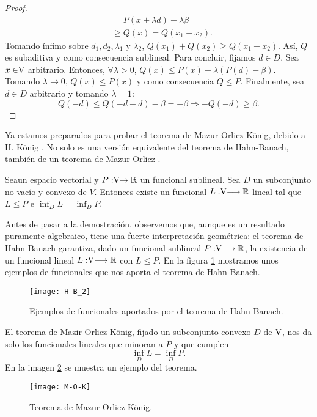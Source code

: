 \begin{proof}
\begin{equation*}
\begin{split}
		& = P(x +\lambda d) - \lambda \beta\\ 
		& \geq Q(x) = Q(x_1 + x_2).
		\end{split}
		\end{equation*}
		Tomando ínfimo sobre $ d_1, d_2, \lambda_1 $ y $ \lambda_2 $, $  Q(x_1) + Q (x_2 ) \geq Q (x_1 + x_2 ) $. Así, $ Q $ es subaditiva y como consecuencia sublineal. Para concluir, fijamos $ d \in D $. Sea $ x \in \vecSpace $ arbitrario. Entonces, $ \forall \lambda > 0 $, $ Q(x) \leq P(x) + \lambda (P(d) - \beta )$. Tomando $ \lambda \longrightarrow 0 $, $ Q(x) \leq P(x)$ y como consecuencia $ Q \leq P $. Finalmente, sea $ d \in D $ arbitrario y tomando $ \lambda = 1 $:
		\[Q(-d) \leq Q(-d+d) - \beta = -\beta \Longrightarrow  -Q(-d) \geq \beta.  \]
		
	\end{proof}
\bigskip

Ya estamos preparados para probar el teorema de Mazur-Orlicz-König, debido a H. König \cite{König1, König2}. No solo es una versión equivalente del teorema de Hahn-Banach, también de un teorema de Mazur-Orlicz \cite{mo}. 

\bigskip
	
	\begin{teoremaBox}\label{M-O}
		Sea\vecSpace un espacio vectorial y $P:\vecSpace \rightarrow \RR$ un funcional sublineal.  Sea $ D $ un subconjunto no vacío y convexo de $ V $. Entonces existe un funcional $ L: \vecSpace \longrightarrow \RR $ lineal tal que $ L \leq P $ e $ \inf_D L = \inf_D P $.
	\end{teoremaBox}

Antes de pasar a la demostración, observemos que, aunque es un resultado puramente algebraico, tiene una fuerte interpretación geométrica: el teorema de Hahn-Banach garantiza, dado un funcional sublineal $ P: \vecSpace \longrightarrow \RR $, la existencia de un funcional lineal $ L:\vecSpace \longrightarrow \RR $ con $ L \leq P $. En la figura \ref{H-B-varios} mostramos unos ejemplos de funcionales que nos aporta el teorema de Hahn-Banach. \\

\begin{figure}[h!]
	\centering
	\texttt{[image: H-B\_2]}
	\caption{Ejemplos de funcionales aportados por el teorema de Hahn-Banach.}
	\label{H-B-varios}
\end{figure} 

El teorema de Mazir-Orlicz-König, fijado un subconjunto convexo $ D $ de $ \vecSpace $, nos da solo los funcionales lineales que minoran a $ P $ y que cumplen
\[
\inf_D L = \inf_D P.
\]
En la imagen \ref{M-O-K-fotos} se muestra un ejemplo del teorema.
\begin{figure}[h!]
	\centering
	\texttt{[image: M-O-K]}
	\caption{Teorema de Mazur-Orlicz-König.}
	\label{M-O-K-fotos}
\end{figure} 

